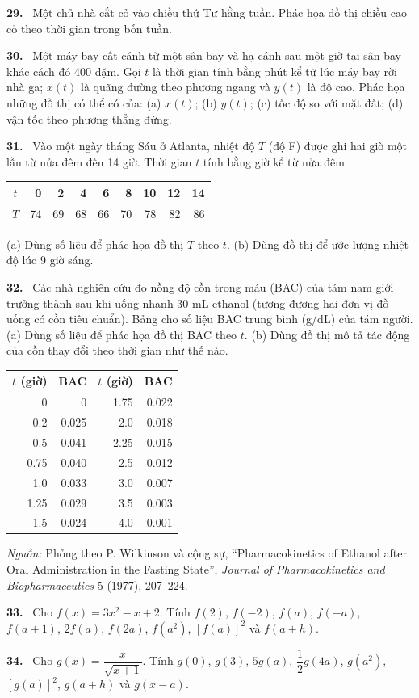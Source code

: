 \documentclass[12pt,a4paper]{article}
\newcommand{\bt}[1]{\par\smallskip\noindent\textbf{#1.}\ }
\begin{document}
\bt{29} Một chủ nhà cắt cỏ vào chiều thứ Tư hằng tuần. Phác họa đồ thị chiều cao cỏ theo thời gian trong bốn tuần.
\bt{30} Một máy bay cất cánh từ một sân bay và hạ cánh sau một giờ tại sân bay khác cách đó 400 dặm. Gọi $t$ là thời gian tính bằng phút kể từ lúc máy bay rời nhà ga; $x(t)$ là quãng đường theo phương ngang và $y(t)$ là độ cao. Phác họa những đồ thị có thể có của: (a) $x(t)$; (b) $y(t)$; (c) tốc độ so với mặt đất; (d) vận tốc theo phương thẳng đứng.
\bt{31} Vào một ngày tháng Sáu ở Atlanta, nhiệt độ $T$ (độ F) được ghi hai giờ một lần từ nửa đêm đến 14 giờ. Thời gian $t$ tính bằng giờ kể từ nửa đêm.
\begin{center}\begin{tabular}{c|rrrrrrrr}$t$&0&2&4&6&8&10&12&14\\\hline$T$&74&69&68&66&70&78&82&86\end{tabular}\end{center}
(a) Dùng số liệu để phác họa đồ thị $T$ theo $t$. (b) Dùng đồ thị để ước lượng nhiệt độ lúc 9 giờ sáng.
\bt{32} Các nhà nghiên cứu đo nồng độ cồn trong máu (BAC) của tám nam giới trưởng thành sau khi uống nhanh 30 mL ethanol (tương đương hai đơn vị đồ uống có cồn tiêu chuẩn). Bảng cho số liệu BAC trung bình (g/dL) của tám người. (a) Dùng số liệu để phác họa đồ thị BAC theo $t$. (b) Dùng đồ thị mô tả tác động của cồn thay đổi theo thời gian như thế nào.
\begin{center}\begin{tabular}{rr@{\qquad}rr}\toprule$t$ (giờ)&BAC&$t$ (giờ)&BAC\\\midrule
0&0&1.75&0.022\\0.2&0.025&2.0&0.018\\0.5&0.041&2.25&0.015\\0.75&0.040&2.5&0.012\\1.0&0.033&3.0&0.007\\1.25&0.029&3.5&0.003\\1.5&0.024&4.0&0.001\\\bottomrule\end{tabular}\end{center}
\noindent\textit{Nguồn:} Phỏng theo P. Wilkinson và cộng sự, ``Pharmacokinetics of Ethanol after Oral Administration in the Fasting State'', \textit{Journal of Pharmacokinetics and Biopharmaceutics} 5 (1977), 207–224.
\bt{33} Cho $f(x)=3x^2-x+2$. Tính $f(2)$, $f(-2)$, $f(a)$, $f(-a)$, $f(a+1)$, $2f(a)$, $f(2a)$, $f(a^2)$, $[f(a)]^2$ và $f(a+h)$.
\bt{34} Cho $g(x)=\dfrac{x}{\sqrt{x+1}}$. Tính $g(0)$, $g(3)$, $5g(a)$, $\dfrac12g(4a)$, $g(a^2)$, $[g(a)]^2$, $g(a+h)$ và $g(x-a)$.
\end{document}

